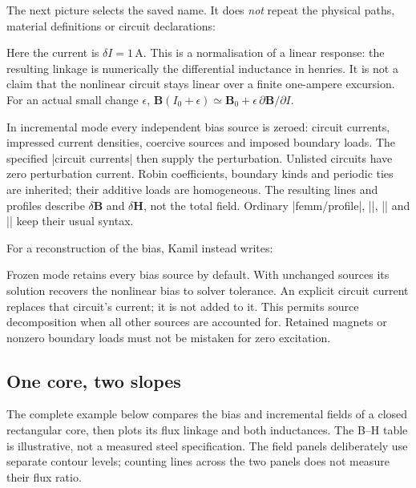 The next picture selects the saved name. It does \emph{not} repeat the
physical paths, material definitions or circuit declarations:
\begin{codeexample}
\end{codeexample}
Here the current is $\delta I=1\,\mathrm A$. This is a normalisation of a
linear response: the resulting linkage is numerically the differential
inductance in henries. It is not a claim that the nonlinear circuit stays
linear over a finite one-ampere excursion. For an actual small change $\epsilon$,
$\mathbf B(I_0+\epsilon)\simeq\mathbf B_0+
\epsilon\,\partial\mathbf B/\partial I$.

In incremental mode every independent bias source is zeroed: circuit currents,
impressed current densities, coercive sources and imposed boundary loads.
The specified |circuit currents| then supply the perturbation. Unlisted
circuits have zero perturbation current. Robin coefficients, boundary kinds
and periodic ties are inherited; their additive loads are homogeneous.
The resulting lines and profiles describe $\delta\mathbf B$ and
$\delta\mathbf H$, not the total field. Ordinary |femm/profile|,
|\femmplot|, |\femmmeasure| and |\femmresultplot| keep their usual syntax.

For a reconstruction of the bias, Kamil instead writes:
\begin{codeexample}
\end{codeexample}
Frozen mode retains every bias source by default. With unchanged sources its
solution recovers the nonlinear bias to solver tolerance. An explicit circuit
current replaces that circuit's current; it is not added to it. This permits
source decomposition when all other sources are accounted for. Retained
magnets or nonzero boundary loads must not be mistaken for zero excitation.

\subsection{One core, two slopes}
The complete example below compares the bias and incremental fields of a
closed rectangular core, then plots its flux linkage and both inductances.
The B--H table is illustrative, not a measured steel specification. The field
panels deliberately use separate contour levels; counting lines across the
two panels does not measure their flux ratio.

